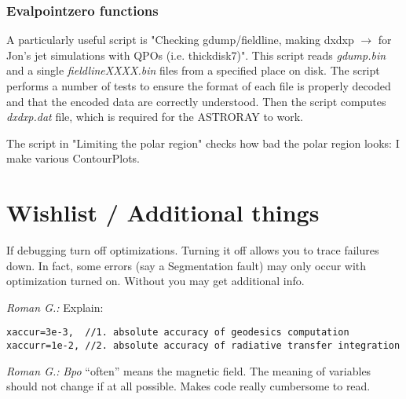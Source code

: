 \documentclass{emulateapj}
\newcommand{\rg}[1]{\color{blue}\textit{Roman G.:} #1\color{black}}
\begin{document}
\subsubsection{Evalpointzero functions}
A particularly useful script is "Checking gdump/fieldline, making
dxdxp $\rightarrow$ for Jon's jet simulations with QPOs
(i.e. thickdisk7)".  This script reads \textit{gdump.bin} and a single
\textit{fieldlineXXXX.bin} files from a specified place on disk.  The
script performs a number of tests to ensure the format of each file is
properly decoded and that the encoded data are correctly understood.
Then the script computes \textit{dxdxp.dat} file, which is required
for the ASTRORAY to work.

The script in "Limiting the polar region" checks how bad the polar
region looks: I make various ContourPlots.


\section{Wishlist / Additional things}
If debugging turn off optimizations. Turning it off allows you to
trace failures down. In fact, some errors (say a Segmentation fault)
may only occur with optimization turned on. Without you may get
additional info.

\rg{Explain:}
\begin{verbatim}
xaccur=3e-3,  //1. absolute accuracy of geodesics computation
xaccurr=1e-2, //2. absolute accuracy of radiative transfer integration     
\end{verbatim}

\rg{\textit{Bpo} ``often'' means the magnetic field. The meaning of
variables should not change if at all possible. Makes code really
cumbersome to read.}

\newpage %




\end{document}
